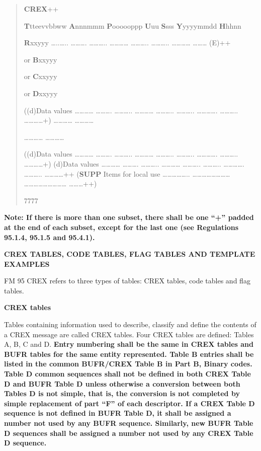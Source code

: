 \begin{quote}
\textbf{CREX}++

\textbf{T}tteevvbbww \textbf{A}nnnmmm \textbf{P}oooooppp \textbf{U}uu \textbf{S}sss \textbf{Y}yyyymmdd \textbf{H}hhnn

\textbf{R}xxyyy \ldots..\ldots.. \ldots\ldots\ldots. \ldots\ldots\ldots.. \ldots\ldots\ldots\ldots{} \ldots\ldots\ldots.. \ldots\ldots\ldots.. \ldots\ldots\ldots\ldots{} \ldots\ldots\ldots{} (E)++

or \textbf{B}xxyyy

or \textbf{C}xxyyy

or \textbf{D}xxyyy

((d)Data values \ldots\ldots\ldots\ldots{} \ldots\ldots\ldots. \ldots\ldots\ldots.. \ldots\ldots\ldots\ldots{} \ldots\ldots\ldots.. \ldots\ldots\ldots.. \ldots\ldots\ldots\ldots. \ldots\ldots\ldots.. \ldots\ldots\ldots\ldots+) \ldots\ldots\ldots\ldots{} \ldots\ldots\ldots\ldots{}

\ldots\ldots\ldots\ldots{} \ldots\ldots\ldots\ldots{}

((d)Data values \ldots\ldots\ldots\ldots{} \ldots\ldots\ldots. \ldots\ldots\ldots.. \ldots\ldots\ldots\ldots{} \ldots\ldots\ldots.. \ldots\ldots\ldots.. \ldots\ldots\ldots\ldots. \ldots\ldots\ldots.. \ldots\ldots\ldots\ldots+) (d)Data values \ldots\ldots\ldots\ldots{} \ldots\ldots\ldots. \ldots\ldots\ldots.. \ldots\ldots\ldots\ldots{} \ldots\ldots\ldots.. \ldots\ldots\ldots.. \ldots\ldots\ldots\ldots. \ldots\ldots\ldots.. \ldots\ldots\ldots\ldots++ (\textbf{SUPP} Items for local use \ldots\ldots\ldots\ldots\ldots.. \ldots\ldots\ldots\ldots\ldots\ldots\ldots\ldots{} \ldots\ldots\ldots\ldots\ldots\ldots\ldots\ldots\ldots{} \ldots\ldots\ldots++)

7777
\end{quote}

\textbf{Note: If there is more than one subset, there shall be one ``+'' padded at the end of each subset, except for the last one (see Regulations 95.1.4, 95.1.5 and 95.4.1).}

\textbf{CREX TABLES, CODE TABLES, FLAG TABLES AND TEMPLATE EXAMPLES}

FM 95 CREX refers to three types of tables: CREX tables, code tables and flag tables.

\textbf{CREX tables}

Tables containing information used to describe, classify and define the contents of a CREX message are called CREX tables. Four CREX tables are defined: Tables A, B, C and D. \textbf{Entry numbering shall be the same in CREX tables and BUFR tables for the same entity represented. Table B entries shall be listed in the common BUFR/CREX Table B in Part B, Binary codes. Table D common sequences shall not be defined in both CREX Table D and BUFR Table D unless otherwise a conversion between both Tables D is not simple, that is, the conversion is not completed by simple replacement of part ``F'' of each descriptor. If a CREX Table D sequence is not defined in BUFR Table D, it shall be assigned a number not used by any BUFR sequence. Similarly, new BUFR Table D sequences shall be assigned a number not used by any CREX Table D sequence.}

